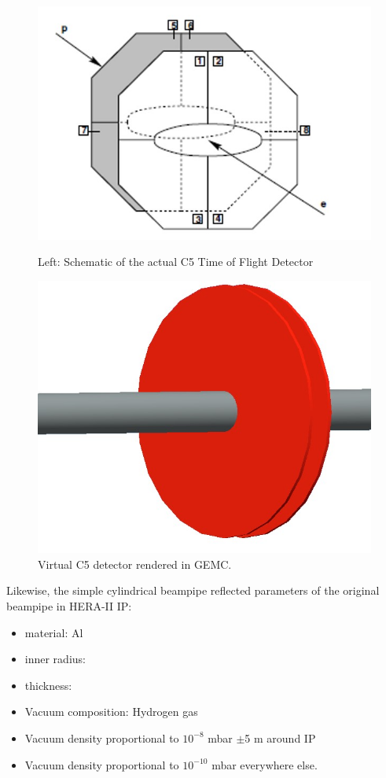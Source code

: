 \begin{figure}
	\centering
	\begin{minipage}{0.45\textwidth}
		\centering
		\includegraphics[width=.75\textwidth]{../../img/hera_c5.jpg}
		\caption {Left: Schematic of the actual C5 Time of Flight Detector  }
		
	\end{minipage}\hfill
	\begin{minipage}{0.45\textwidth}
		\centering	\includegraphics[width=.75\textwidth]{../../img/C5_gemc}	
		\caption {Virtual C5 detector rendered in GEMC.}
	\end{minipage}
	
\end{figure}

Likewise, the simple cylindrical beampipe reflected parameters of the original beampipe in HERA-II IP:
\begin{itemize}
	\item material: Al
	\item inner radius: 
	\item thickness: 
	\item Vacuum composition: Hydrogen gas
	\item Vacuum density proportional to $10^{-8}$ mbar $\pm$5 m around IP 
	\item Vacuum density proportional to $10^{-10}$ mbar everywhere else.
\end{itemize}

